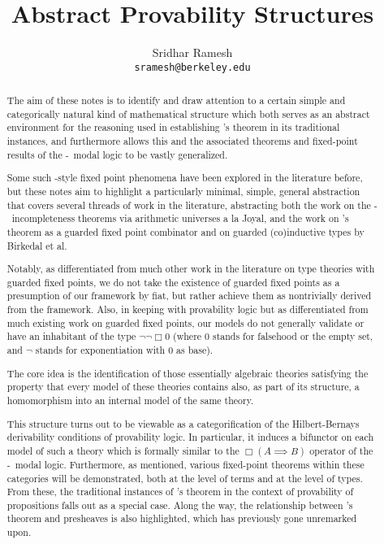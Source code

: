 \documentclass[12pt]{article}
\title{Abstract Provability Structures}
\author{
  Sridhar Ramesh\\
  \texttt{sramesh@berkeley.edu}
}
\begin{document}
\maketitle

\begin{abstract}

The aim of these notes is to identify and draw attention to a certain simple and categorically natural kind of mathematical structure which both serves as an abstract environment for the reasoning used in establishing \Loeb's theorem in its traditional instances, and furthermore allows this and the associated theorems and fixed-point results of the \Goedel-\Loeb\ modal logic to be vastly generalized.

Some such \Loeb-style fixed point phenomena have been explored in the literature before, but these notes aim to highlight a particularly minimal, simple, general abstraction that covers several threads of work in the literature, abstracting both the work on the \Goedel-\Loeb\ incompleteness theorems via arithmetic universes a la Joyal, and the work on \Loeb's theorem as a guarded fixed point combinator and on guarded (co)inductive types by Birkedal et al.

Notably, as differentiated from much other work in the literature on type theories with guarded fixed points, we do not take the existence of guarded fixed points as a presumption of our framework by fiat, but rather achieve them as nontrivially derived from the framework. Also, in keeping with provability logic but as differentiated from much existing work on guarded fixed points, our models do not generally validate or have an inhabitant of the type $\neg \neg \Box 0$ (where $0$ stands for falsehood or the empty set, and $\neg$ stands for exponentiation with $0$ as base).

The core idea is the identification of those essentially algebraic theories satisfying the property that every model of these theories contains also, as part of its structure, a homomorphism into an internal model of the same theory.

This structure turns out to be viewable as a categorification of the Hilbert-Bernays derivability conditions of provability logic. In particular, it induces a bifunctor on each model of such a theory which is formally similar to the $\Box(A \implies B)$ operator of the \Goedel-\Loeb\ modal logic. Furthermore, as mentioned, various fixed-point theorems within these categories will be demonstrated, both at the level of terms and at the level of types. From these, the traditional instances of \Loeb's theorem in the context of provability of propositions falls out as a special case. Along the way, the relationship between \Loeb's theorem and presheaves is also highlighted, which has previously gone unremarked upon.


\end{abstract}
\end{document}
